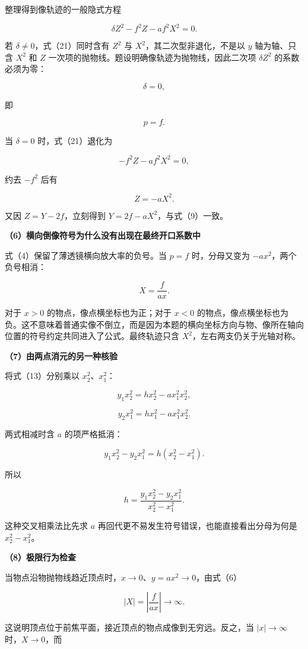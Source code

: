 \documentclass[12pt,a4paper,UTF8]{ctexart}
\begin{document}
整理得到像轨迹的一般隐式方程

\[
\boxed{
\delta Z^2-f^2Z-af^2X^2=0
}.
\tag{21}
\]

若 \(\delta\ne0\)，式（21）同时含有 \(Z^2\) 与
\(X^2\)，其二次型非退化，不是以 \(y\) 轴为轴、只含 \(X^2\) 和 \(Z\)
一次项的抛物线。题设明确像轨迹为抛物线，因此二次项 \(\delta Z^2\)
的系数必须为零：

\[
\delta=0,
\]

即

\[
p=f.
\]

当 \(\delta=0\) 时，式（21）退化为

\[
-f^2Z-af^2X^2=0,
\]

约去 \(-f^2\) 后有

\[
Z=-aX^2.
\]

又因 \(Z=Y-2f\)，立刻得到 \(Y=2f-aX^2\)，与式（9）一致。

\textbf{（6）横向倒像符号为什么没有出现在最终开口系数中}

式（4）保留了薄透镜横向放大率的负号。当 \(p=f\) 时，分母又变为
\(-ax^2\)，两个负号相消：

\[
X=\frac{f}{ax}.
\]

对于 \(x>0\) 的物点，像点横坐标也为正；对于 \(x<0\)
的物点，像点横坐标也为负。这不意味着普通实像不倒立，而是因为本题的横向坐标方向与物、像所在轴向位置的符号约定共同进入了公式。最终轨迹只含
\(X^2\)，左右两支仍关于光轴对称。

\textbf{（7）由两点消元的另一种核验}

将式（13）分别乘以 \(x_2^2\)、\(x_1^2\)：

\[
y_1x_2^2=hx_2^2-ax_1^2x_2^2,
\]

\[
y_2x_1^2=hx_1^2-ax_1^2x_2^2.
\]

两式相减时含 \(a\) 的项严格抵消：

\[
y_1x_2^2-y_2x_1^2
=h(x_2^2-x_1^2).
\]

所以

\[
h=\frac{y_1x_2^2-y_2x_1^2}{x_2^2-x_1^2}.
\]

这种交叉相乘法比先求 \(a\)
再回代更不易发生符号错误，也能直接看出分母为何是 \(x_2^2-x_1^2\)。

\textbf{（8）极限行为检查}

当物点沿物抛物线趋近顶点时，\(x\to0\)、\(y=ax^2\to0\)，由式（6）

\[
|X|=\left|\frac{f}{ax}\right|\to\infty.
\]

这说明顶点位于前焦平面，接近顶点的物点成像到无穷远。反之，当
\(|x|\to\infty\) 时，\(X\to0\)，而
\end{document}
